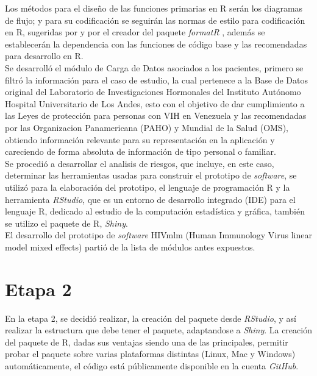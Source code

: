 Los m\'etodos para el dise\~no de las funciones primarias en R ser\'an los diagramas de flujo; y para su codificaci\'on se seguir\'an las normas de estilo para codificaci\'on en R, sugeridas por \citet{test} y por el creador del paquete \emph{formatR} \citet{format}, adem\'as se establecer\'an la dependencia con las funciones de c\'odigo base y las recomendadas para desarrollo en R.\\

Se desarroll\'o el m\'odulo de Carga de Datos  asociados a los  pacientes, primero se filtr\'o la informaci\'on para el caso de estudio, la cual  pertenece a  la Base de Datos original del Laboratorio de Investigaciones Hormonales del Instituto Aut\'onomo Hospital Universitario de Los Andes, esto con el objetivo de dar cumplimiento a las Leyes de protección para personas con VIH en Venezuela y las recomendadas por las Organizacion Panamericana (PAHO) y Mundial de la Salud (OMS),  obtiendo informaci\'on relevante para su  representaci\'on en la aplicaci\'on y careciendo de forma absoluta de información de tipo personal o familiar.\\

Se procedi\'o a desarrollar el analisis de riesgos, que incluye, en este caso,  determinar las herramientas usadas para construir el prototipo de \textit{software}, se utiliz\'o para la elaboraci\'on del prototipo, el lenguaje de programaci\'on R y la herramienta \textit{RStudio}, que es un entorno de desarrollo integrado (IDE) para el lenguaje R, dedicado al estudio de la computaci\'on estad\'istica y gr\'afica,  tambi\'en se utilizo el paquete de R, \textit{Shiny}.\\

El desarrollo del prototipo de \textit{software} HIVmlm (Human Immunology Virus linear model mixed effects) parti\'o de la lista de m\'odulos antes expuestos.

\section{Etapa 2}

En la etapa 2, se decidi\'o realizar, la creaci\'on del paquete desde \textit{RStudio}, y as\'i realizar la estructura que debe tener el paquete, adaptandose a \textit{Shiny}. La creaci\'on del paquete de R, dadas sus ventajas siendo una de las principales, permitir probar el paquete sobre varias plataformas distintas (Linux, Mac y Windows) autom\'aticamente, el c\'odigo est\'a p\'ublicamente disponible en la cuenta \textit{GitHub}. \\

